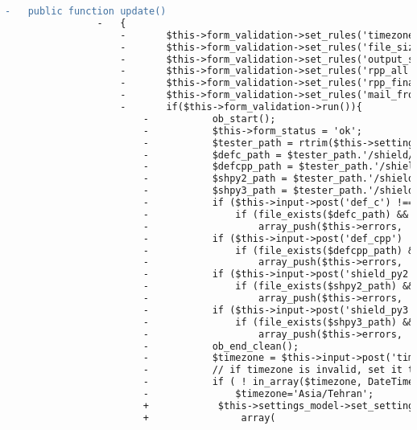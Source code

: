 \begin{lstlisting}[language=diff, caption=Perubahan pada kode Settings.php]
				-	public function update()
				-	{
					-		$this->form_validation->set_rules('timezone', 'timezone', 'required');
					-		$this->form_validation->set_rules('file_size_limit', 'File size limit', 'integer|greater_than_equal_to[0]');
					-		$this->form_validation->set_rules('output_size_limit', 'Output size limit', 'integer|greater_than_equal_to[0]');
					-		$this->form_validation->set_rules('rpp_all', 'results per page (all submissions)', 'integer|greater_than_equal_to[0]');
					-		$this->form_validation->set_rules('rpp_final', 'results per page (final submissions)', 'integer|greater_than_equal_to[0]');
					-		$this->form_validation->set_rules('mail_from', 'email', 'valid_email');
					-		if($this->form_validation->run()){
						-			ob_start();
						-			$this->form_status = 'ok';
						-			$tester_path = rtrim($this->settings_model->get_setting('tester_path'), '/');
						-			$defc_path = $tester_path.'/shield/defc.h';
						-			$defcpp_path = $tester_path.'/shield/defcpp.h';
						-			$shpy2_path = $tester_path.'/shield/shield_py2.py';
						-			$shpy3_path = $tester_path.'/shield/shield_py3.py';
						-			if ($this->input->post('def_c') !== file_get_contents($defc_path))
						-				if (file_exists($defc_path) && file_put_contents($defc_path,$this->input->post('def_c')) === FALSE)
						-					array_push($this->errors, 'File defc.h is not writable. Edit it manually.');
						-			if ($this->input->post('def_cpp') !== file_get_contents($defcpp_path))
						-				if (file_exists($defcpp_path) && file_put_contents($defcpp_path,$this->input->post('def_cpp')) === FALSE)
						-					array_push($this->errors, 'File defcpp.h is not writable. Edit it manually.');
						-			if ($this->input->post('shield_py2') !== file_get_contents($shpy2_path))
						-				if (file_exists($shpy2_path) && file_put_contents($shpy2_path,$this->input->post('shield_py2')) === FALSE)
						-					array_push($this->errors, 'File shield_py2.py is not writable. Edit it manually.');
						-			if ($this->input->post('shield_py3') !== file_get_contents($shpy3_path))
						-				if (file_exists($shpy3_path) && file_put_contents($shpy3_path,$this->input->post('shield_py3')) === FALSE)
						-					array_push($this->errors, 'File shield_py3.py is not writable. Edit it manually.');
						-			ob_end_clean();
						-			$timezone = $this->input->post('timezone');
						-			// if timezone is invalid, set it to 'Asia/Tehran' :
						-			if ( ! in_array($timezone, DateTimeZone::listIdentifiers()) )
						-				$timezone='Asia/Tehran';
						+            $this->settings_model->set_settings(
						+                array(

\end{lstlisting}
